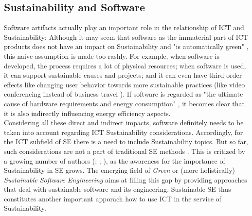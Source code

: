 \documentclass[oribibl]{llncs}
\begin{document}
\subsection{Sustainability and Software\label{SustSW}}
Software artifacts actually play an important role in the relationship of ICT and Sustainability: Although it may seem that software as the immaterial part of ICT products does not have an impact on Sustainability and "is automatically green" \cite[p.\,3]{agarwal_sustainable_2012}, this naive assumption is made too rashly. For example, when software is developed, the process requires a lot of physical resources; when software is used, it can support sustainable causes and projects; %
and it can even have third-order effects like changing user behavior towards more sustainable practices (like video conferencing instead of business travel \cite{amsel_toward_2011}). If software is regarded as "the ultimate cause of hardware requirements and energy consumption" \cite[p.\,1]{kern_impacts_2015}, it becomes clear that it is also indirectly influencing energy efficiency aspects.\\
Considering all these direct and indirect impacts, software definitely needs to be taken into account regarding ICT Sustainability considerations. Accordingly, for the ICT subfield of SE there is a need to include Sustainability topics. But so far, such considerations are not a part of traditional SE methods \cite{penzenstadler_supporting_2012}. This is critized by a growing number of authors (\cite{penzenstadler_supporting_2012}; \cite{agarwal_sustainable_2012}; \cite{amsel_toward_2011}), as the awareness for the importance of Sustainability in SE grows. The emerging field of \textit{Green} or (more holistically) \textit{Sustainable Software Engineering} %
aims at filling this gap by providing approaches that deal with sustainable software and its engineering. Sustainable SE thus constitutes another important apporach how to use ICT in the service of Sustainability.\\ %
\end{document}
